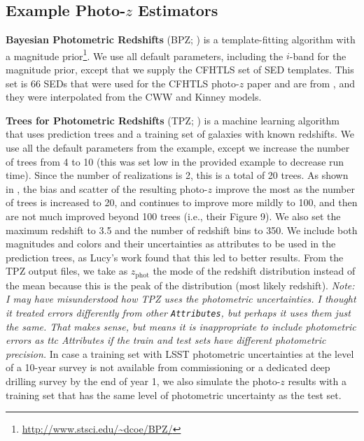 \documentclass[DM,lsstdraft,toc]{lsstdoc}
\begin{document}
\subsection{Example Photo-$z$ Estimators}\label{ssec:estimators}

\textbf{Bayesian Photometric Redshifts} (BPZ; \citealt{2000ApJ...536..571B}) is a template-fitting algorithm with a magnitude prior\footnote{\url{http://www.stsci.edu/~dcoe/BPZ/}}. We use all default parameters, including the $i$-band for the magnitude prior, except that we supply the CFHTLS set of SED templates. This set is 66 SEDs that were used for the CFHTLS photo-$z$ paper and are from \cite{2006A&A...457..841I}, and they were interpolated from the CWW and Kinney models.

\textbf{Trees for Photometric Redshifts} (TPZ; \citealt{2013ascl.soft04011C,2013MNRAS.432.1483C}) is a machine learning algorithm that uses prediction trees and a training set of galaxies with known redshifts. We use all the default parameters from the example, except we increase the number of trees from 4 to 10 (this was set low in the provided example to decrease run time). Since the number of realizations is 2, this is a total of 20 trees. As shown in \cite{2013MNRAS.432.1483C}, the bias and scatter of the resulting photo-$z$ improve the most as the number of trees is increased to 20, and continues to improve more mildly to 100, and then are not much improved beyond 100 trees (i.e., their Figure 9). We also set the maximum redshift to 3.5 and the number of redshift bins to 350. We include both magnitudes and colors and their uncertainties as attributes to be used in the prediction trees, as Lucy's work found that this led to better results. From the TPZ output files, we take as $z_\mathrm{phot}$ the mode of the redshift distribution instead of the mean because this is the peak of the distribution (most likely redshift). \textit{Note: I may have misunderstood how TPZ uses the photometric uncertainties. I thought it treated errors differently from other \texttt{Attributes}, but perhaps it uses them just the same. That makes sense, but means it is inappropriate to include photometric errors as {ttc Attributes} if the train and test sets have different photometric precision.} In case a training set with LSST photometric uncertainties at the level of a 10-year survey is not available from commissioning or a dedicated deep drilling survey by the end of year 1, we also simulate the photo-$z$ results with a training set that has the same level of photometric uncertainty as the test set.
\end{document}
